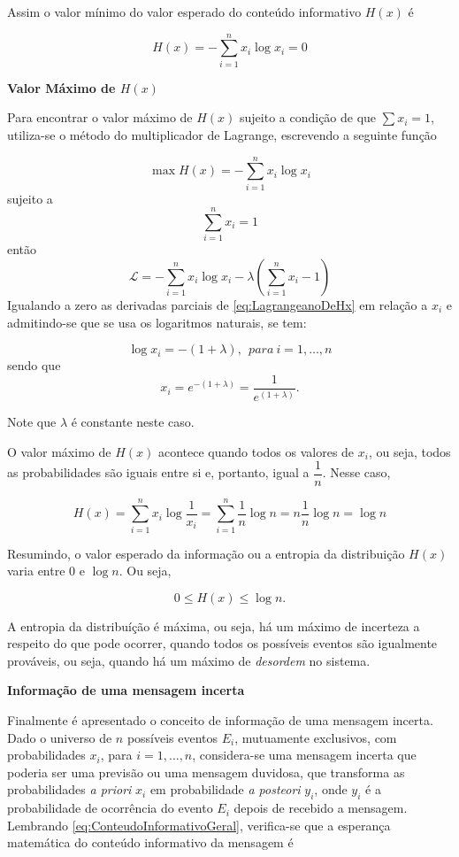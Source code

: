 \documentclass[
]{book}
\begin{document}
Assim o valor mínimo do valor esperado do conteúdo informativo \(H(x)\) é

\[
H(x) = - \sum_{i=1}^{n}x_i \log x_i = 0
\]

\textbf{Valor Máximo de \(H(x)\)}

Para encontrar o valor máximo de \(H(x)\) sujeito a condição de que \(\sum x_i = 1\), utiliza-se o método do multiplicador de Lagrange, escrevendo a seguinte função

\[
  \max H(x) = -\sum_{i=1}^{n}x_i \log x_i
\]
sujeito a
\[
  \sum_{i=1}^{n} x_i = 1
\]
então
\[
  \mathcal{L} = -\sum_{i=1}^{n}x_i \log x_i - \lambda\left( \sum_{i=1}^{n} x_i  - 1 \right)
  \label{eq:LagrangeanoDeHx}
\]
Igualando a zero as derivadas parciais de \eqref{eq:LagrangeanoDeHx} em relação a \(x_i\) e admitindo-se que se usa os logaritmos naturais, se tem:

\[
  \log x_i = -(1 + \lambda),~~para~i=1,\ldots ,n
\]
sendo que
\[
  x_i = e^{-(1+\lambda)} = \dfrac{1}{e^{(1+\lambda)}}.
\]

Note que \(\lambda\) é constante neste caso.

O valor máximo de \(H(x)\) acontece quando todos os valores de \(x_i\), ou seja, todos as probabilidades são iguais entre si e, portanto, igual a \(\dfrac{1}{n}\). Nesse caso,

\[
  H(x) = \sum_{i=1}^{n} x_i \log \dfrac{1}{x_i} = \sum_{i=1}^{n} \dfrac{1}{n} \log n = n \dfrac{1}{n}\log n = \log n 
\]

Resumindo, o valor esperado da informação ou a entropia da distribuição \(H(x)\) varia entre 0 e \(\log n\). Ou seja,

\[
  0\leq H(x) \leq \log n.
  \label{eq:IntervaloDeVariacaoDeHx}
\]

A entropia da distribuíção é máxima, ou seja, há um máximo de incerteza a respeito do que pode ocorrer, quando todos os possíveis eventos são igualmente prováveis, ou seja, quando há um máximo de \emph{desordem} no sistema.

\textbf{Informação de uma mensagem incerta}

Finalmente é apresentado o conceito de informação de uma mensagem incerta. Dado o universo de \(n\) possíveis eventos \(E_i\), mutuamente exclusivos, com probabilidades \(x_i\), para \(i=1, \ldots, n\), considera-se uma mensagem incerta que poderia ser uma previsão ou uma mensagem duvidosa, que transforma as probabilidades \emph{a priori} \(x_i\) em probabilidade \emph{a posteori} \(y_i\), onde \(y_i\) é a probabilidade de ocorrência do evento \(E_i\) depois de recebido a mensagem. Lembrando
\eqref{eq:ConteudoInformativoGeral}, verifica-se que a esperança matemática do conteúdo informativo da mensagem é
\end{document}
